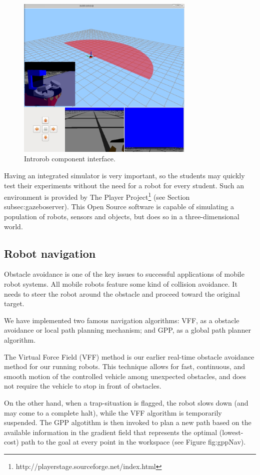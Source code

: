 \documentclass[twocolumn]{svjour3}          %
\begin{document}
\begin{figure}[h!]
  \includegraphics[width=8.5cm]{figs/introrob.jpg}
\caption{Introrob component interface.}
\label{fig:introrob}
\end{figure}

Having an integrated simulator is very important, so the students may quickly test their experiments without the need for a robot for every student. Such an environment is provided by The Player Project\footnote{http://playerstage.sourceforge.net/index.html} (see Section {subsec:gazeboserver}). This Open Source software is capable of simulating a population of robots, sensors and objects, but does so in a three-dimensional world.

\subsection{Robot navigation}

Obstacle avoidance is one of the key issues to successful applications of mobile robot systems. All mobile robots feature some kind of collision avoidance. It needs to steer the robot around the obstacle and proceed toward the original target.

We have implemented two famous navigation algorithms: VFF, as a obstacle avoidance or local path planning mechanism; and GPP, as a global path planner algorithm.

The Virtual Force Field (VFF) method is our earlier real-time obstacle avoidance method for our running robots. This technique allows for fast, continuous, and smooth motion of the controlled vehicle among unexpected obstacles, and does not require the vehicle to stop in front of obstacles.

On the other hand, when a trap-situation is flagged, the robot slows down (and may come to a complete halt),
while the VFF algorithm is temporarily suspended. The GPP algotithm is then invoked to plan a new path based on the available information in the gradient field that represents the optimal (lowest-cost) path to the goal at every point in the workspace (see Figure {fig:gppNav}).
\end{document}
